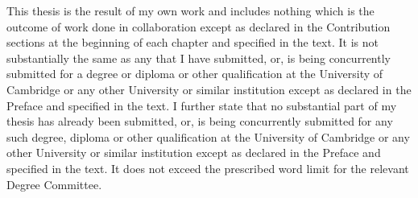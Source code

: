 
\begin{declaration}



This thesis is the result of my own work and includes nothing which is the outcome of work done in collaboration except as declared in the Contribution sections at the beginning of each chapter and specified in the text. 
It is not substantially the same as any that I have submitted, or, is being concurrently submitted for a degree or diploma or other qualification at the University of Cambridge or any other University or similar institution except as declared in the Preface and specified in the text. 
I further state that no substantial part of my thesis has already been submitted, or, is being concurrently submitted for any such degree, diploma or other qualification at the University of Cambridge or any other University or similar institution except as declared in the Preface and specified in the text. 
It does not exceed the prescribed word limit for the relevant Degree Committee.


\end{declaration}
